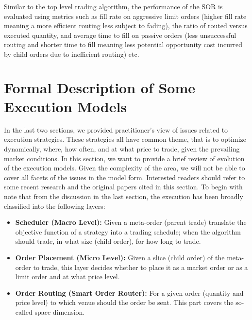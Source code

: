Similar to the top level trading algorithm, the performance of the SOR is evaluated using metrics such as fill rate on aggressive limit orders (higher fill rate meaning a more efficient routing less subject to fading), the ratio of routed versus executed quantity, and average time to fill on passive orders (less unsuccessful routing and shorter time to fill meaning less potential opportunity cost incurred by child orders due to inefficient routing) etc. \label{in:exec_layer2}



\section{Formal Description of Some Execution Models\label{sec:formal_desc_exec_model}}

In the last two sections, we provided practitioner's view of issues related to execution strategies. These strategies all have common theme, that is to optimize dynamically, where, how often, and at what price to trade, given the prevailing market conditions. In this section, we want to provide a brief review of evolution of the execution models. Given the complexity of the area, we will not be able to cover all facets of the issues in the model form. Interested readers should refer to some recent research and the original papers cited in this section. To begin with note that from the discussion in the last section, the execution has been broadly classified into the following layers:

	\begin{itemize}
	\item \textbf{Scheduler (Macro Level):} Given a meta-order (parent trade) translate the objective function of a strategy into a trading schedule; when the algorithm should trade, in what size (child order), for how long to trade.
	
	\item \textbf{Order Placement (Micro Level):} Given a slice (child order) of the meta-order to trade, this layer decides whether to place it as a market order or as a  limit order and at what price level.
	
	\item \textbf{Order Routing (Smart Order Router):} For a given order (quantity and price level) to which venue should the order be sent. This part covers the so-called space dimension.
	\end{itemize}


